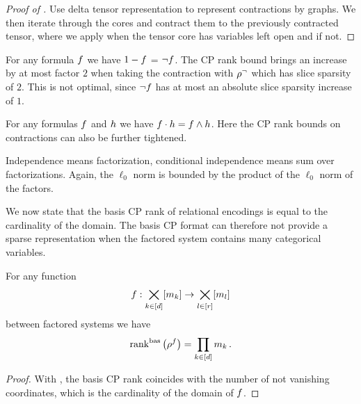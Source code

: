 \begin{proof}[Proof of ]
    Use delta tensor representation to represent contractions by graphs.
    We then iterate through the cores and contract them to the previously contracted tensor, where we apply  when the tensor core has variables left open and  if not.
\end{proof}


\begin{example}
    For any formula $f$ we have $1-f$ = $\lnot f$.
    The CP rank bound brings an increase by at most factor $2$ when taking the contraction with $\rho^{\lnot}$ which has slice sparsity of $2$.
    This is not optimal, since $\lnot f$ has at most an absolute slice sparsity increase of $1$.

    For any formulas $f$ and $h$ we have $f\cdot h = f\land h$.
    Here the CP rank bounds on contractions can also be further tightened.
\end{example}


\begin{example}
    Independence means factorization, conditional independence means sum over factorizations.
    Again, the $\ell_0$ norm is bounded by the product of the $\ell_0$ norm of the factors.
\end{example}






We now state that the basis CP rank of relational encodings is equal to the cardinality of the domain.
The basis CP format can therefore not provide a sparse representation when the factored system contains many categorical variables.

\begin{theorem}
    \label{the:rencodingBasCP}
    For any function
    \[ f : \bigtimes_{k\in[d]}[m_{k}] \rightarrow  \bigtimes_{l\in[r]}[m_{l}] \]
    between factored systems we have
    \[ \mathrm{rank}^{\mathrm{bas}}\left(\rho^{f}\right) =  \prod_{k\in[d]}m_{k} \, . \]
\end{theorem}
\begin{proof}
    With , the basis CP rank coincides with the number of not vanishing coordinates, which is the cardinality of the domain of $f$.
\end{proof}

